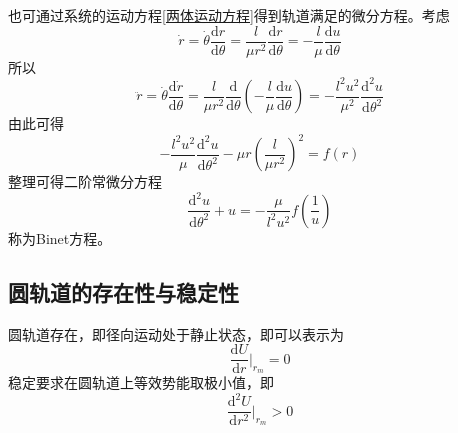也可通过系统的运动方程\eqref{两体运动方程}得到轨道满足的微分方程。考虑
\begin{equation*}
	\dot{r} = \dot{\theta} \frac{\mathrm{d} r}{\mathrm{d} \theta} = \frac{l}{\mu r^2} \frac{\mathrm{d} r}{\mathrm{d} \theta} = -\frac{l}{\mu} \frac{\mathrm{d} u}{\mathrm{d} \theta}
\end{equation*}
所以
\begin{equation*}
	\ddot{r} = \dot{\theta} \frac{\mathrm{d} \dot{r}}{\mathrm{d} \theta} = \frac{l}{\mu r^2} \frac{\mathrm{d}}{\mathrm{d} \theta} \left(-\frac{l}{\mu} \frac{\mathrm{d} u}{\mathrm{d} \theta}\right) = -\frac{l^2u^2}{\mu^2} \frac{\mathrm{d}^2 u}{\mathrm{d} \theta^2}
\end{equation*}
由此可得
\begin{equation*}
	-\frac{l^2u^2}{\mu} \frac{\mathrm{d}^2 u}{\mathrm{d} \theta^2} - \mu r\left(\frac{l}{\mu r^2}\right)^2 = f(r)
\end{equation*}
整理可得二阶常微分方程
\begin{equation}
	\frac{\mathrm{d}^2 u}{\mathrm{d} \theta^2} + u = -\frac{\mu}{l^2 u^2} f\left(\frac{1}{u}\right)
	\label{Binet方程}
\end{equation}
称为{\heiti Binet方程}。

\subsection{圆轨道的存在性与稳定性}

圆轨道存在，即径向运动处于静止状态，即可以表示为
\begin{equation*}
	\frac{\mathrm{d} U}{\mathrm{d} r} \bigg|_{r_m} = 0
\end{equation*}
稳定要求在圆轨道上等效势能取极小值，即
\begin{equation*}
	\frac{\mathrm{d}^2 U}{\mathrm{d} r^2} \bigg|_{r_m} > 0
\end{equation*}

